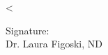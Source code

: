 \documentclass{NDChart}
\begin{document}
<%

\vfill
\nopagebreak[4]
\begin{flushright}
Signature: \underline{\hspace{2.5in}}\\
Dr. Laura Figoski, ND
\end{flushright}
\end{document}

